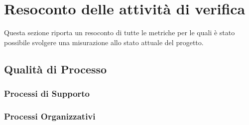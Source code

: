\section{Resoconto delle attività di verifica}
	Questa sezione riporta un resoconto di tutte le metriche per le quali è stato possibile svolgere una misurazione allo stato attuale del progetto.

	\subsection{Qualità di Processo}
		
		\subsubsection{Processi di Supporto}
				
				
				
		\subsubsection{Processi Organizzativi}
			
